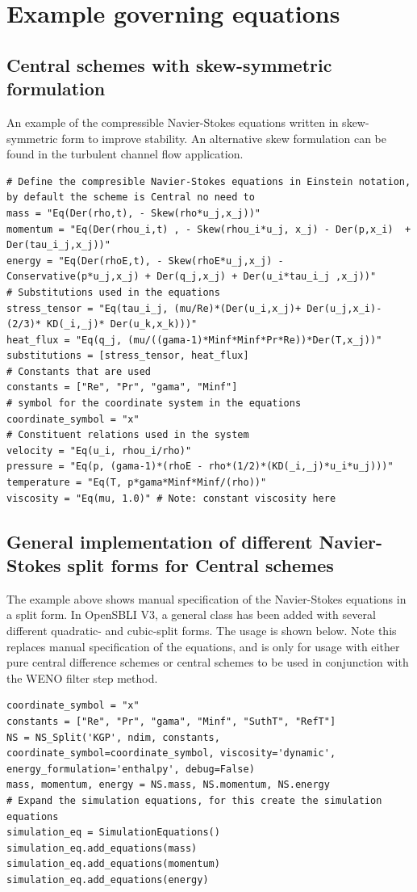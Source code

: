 \documentclass[11pt]{article}
\begin{document}
\newpage
\section{Example governing equations}

\subsection{Central schemes with skew-symmetric formulation}\label{sec:central_skew}
An example of the compressible Navier-Stokes equations written in skew-symmetric form to improve stability. An alternative skew formulation can be found in the turbulent channel flow application. 
\begin{lstlisting}
# Define the compresible Navier-Stokes equations in Einstein notation, by default the scheme is Central no need to
mass = "Eq(Der(rho,t), - Skew(rho*u_j,x_j))"
momentum = "Eq(Der(rhou_i,t) , - Skew(rhou_i*u_j, x_j) - Der(p,x_i)  + Der(tau_i_j,x_j))"
energy = "Eq(Der(rhoE,t), - Skew(rhoE*u_j,x_j) - Conservative(p*u_j,x_j) + Der(q_j,x_j) + Der(u_i*tau_i_j ,x_j))"
# Substitutions used in the equations
stress_tensor = "Eq(tau_i_j, (mu/Re)*(Der(u_i,x_j)+ Der(u_j,x_i)- (2/3)* KD(_i,_j)* Der(u_k,x_k)))"
heat_flux = "Eq(q_j, (mu/((gama-1)*Minf*Minf*Pr*Re))*Der(T,x_j))"
substitutions = [stress_tensor, heat_flux]
# Constants that are used
constants = ["Re", "Pr", "gama", "Minf"]
# symbol for the coordinate system in the equations
coordinate_symbol = "x"
# Constituent relations used in the system
velocity = "Eq(u_i, rhou_i/rho)"
pressure = "Eq(p, (gama-1)*(rhoE - rho*(1/2)*(KD(_i,_j)*u_i*u_j)))"
temperature = "Eq(T, p*gama*Minf*Minf/(rho))"
viscosity = "Eq(mu, 1.0)" # Note: constant viscosity here
\end{lstlisting}

\subsection{General implementation of different Navier-Stokes split forms for Central schemes}
The example above shows manual specification of the Navier-Stokes equations in a split form. In OpenSBLI V3, a general class has been added with several different quadratic- and cubic-split forms. The usage is shown below. Note this replaces manual specification of the equations, and is only for usage with either pure central difference schemes or central schemes to be used in conjunction with the WENO filter step method.

\begin{lstlisting}
coordinate_symbol = "x"
constants = ["Re", "Pr", "gama", "Minf", "SuthT", "RefT"]
NS = NS_Split('KGP', ndim, constants, coordinate_symbol=coordinate_symbol, viscosity='dynamic', energy_formulation='enthalpy', debug=False)
mass, momentum, energy = NS.mass, NS.momentum, NS.energy
# Expand the simulation equations, for this create the simulation equations
simulation_eq = SimulationEquations()
simulation_eq.add_equations(mass)
simulation_eq.add_equations(momentum)
simulation_eq.add_equations(energy)
\end{lstlisting}
\end{document}
